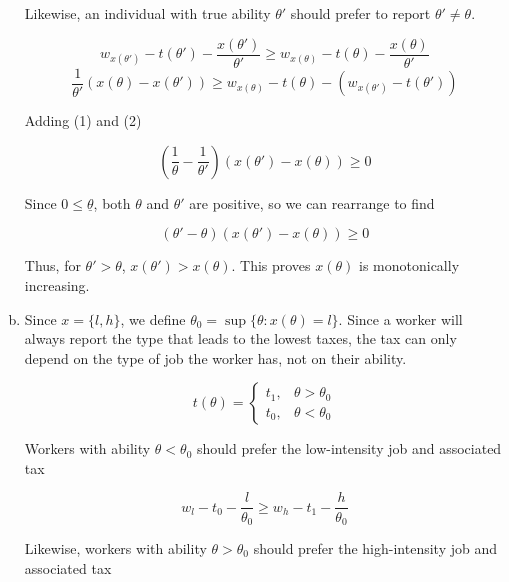 \documentclass{article}
\begin{document}
\begin{enumerate}[(a)]
	Likewise, an individual with true ability $\theta'$ should prefer to report $\theta' \neq \theta$.

	\begin{equation*}
	w_{x(\theta')} - t(\theta') - \frac{x(\theta')}{
	\theta'} \geq w_{x(\theta)} - t(\theta) - \frac{x(\theta)}{
	\theta'}
	\end{equation*}
	\begin{equation}
	\frac{1}{\theta'} (x(\theta) - x(\theta')) \geq w_{x(\theta)} - t(\theta) - (w_{x(\theta')} - t(\theta'))
	\end{equation}

	Adding (1) and (2)

	\begin{equation*}
	(\frac{1}{\theta} - \frac{1}{\theta'})(x(\theta') - x(\theta)) \geq 0
	\end{equation*}

	Since $0 \leq \underline{\theta}$, both $\theta$ and $\theta'$ are positive, so we can rearrange to find

	\begin{equation*}
	(\theta'- \theta)(x(\theta') - x(\theta)) \geq 0
	\end{equation*}

	Thus, for $\theta' > \theta$, $x(\theta') > x(\theta)$. This proves $x(\theta)$ is monotonically increasing.

	\item 

	Since $x = \{l,h\}$, we define $\theta_0 = \sup \{ \theta: x(\theta) = l \}$. Since a worker will always report the type that leads to the lowest taxes, the tax can only depend on the type of job the worker has, not on their ability.

	\begin{equation*}
	t(\theta) =  \begin{cases} 
	      t_1, &\theta > \theta_0 \\
	      t_0, & \theta < \theta_0
	   \end{cases}
	\end{equation*}

	Workers with ability $\theta < \theta_0$ should prefer the low-intensity job and associated tax

	\begin{equation}
		w_l - t_0 - \frac{l}{\theta_0} \geq w_h - t_1 - \frac{h}{\theta_0}
	\end{equation}

	Likewise, workers with ability $\theta > \theta_0$ should prefer the high-intensity job and associated tax


\end{enumerate}
\end{document}
